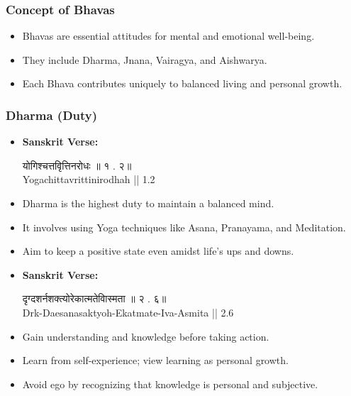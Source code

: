 \begin{frame}[fragile]\frametitle{Concept of Bhavas}

      \begin{itemize}
        \item Bhavas are essential attitudes for mental and emotional well-being.
        \item They include Dharma, Jnana, Vairagya, and Aishwarya.
        \item Each Bhava contributes uniquely to balanced living and personal growth.
      \end{itemize}

\end{frame}

\begin{frame}[fragile]\frametitle{Dharma (Duty)}

      \begin{itemize}
        \item \textbf{Sanskrit Verse:} 
        
        योगिश्चत्तवृित्तिनरोधः   ॥   १ . २॥ \\
        Yogachittavrittinirodhah || 1.2
        
        \item Dharma is the highest duty to maintain a balanced mind.
        \item It involves using Yoga techniques like Asana, Pranayama, and Meditation.
        \item Aim to keep a positive state even amidst life’s ups and downs.

        \item \textbf{Sanskrit Verse:} 
        
        दृग्दशर्नशक्त्योरेकात्मतेवािस्मता   ॥   २ . ६॥ \\
        Drk-Daesanasaktyoh-Ekatmate-Iva-Asmita || 2.6
        
        \item Gain understanding and knowledge before taking action.
        \item Learn from self-experience; view learning as personal growth.
        \item Avoid ego by recognizing that knowledge is personal and subjective.
      \end{itemize}	  

\end{frame}

